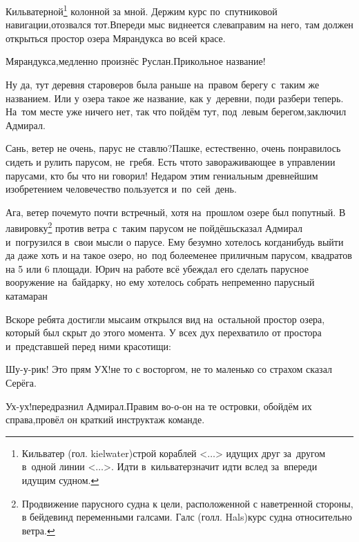 \renewcommand*{\thefootnote}{\fnsymbol{footnote}}
\setcounter{footnote}{0}
\diagdash Кильватерной\footnote{Кильватер (гол. kielwater)\mdash строй кораблей <$\dots$> идущих друг за~другом в~одной линии <$\dots$>. Идти в~кильватер\mdash значит идти вслед за~впереди идущим судном.} колонной за мной. Держим курс по~спутниковой навигации,\mdash отозвался тот.\mdash Впереди мыс виднеется слева\mdash правим на него, там должен открыться простор озера Мярандукса во всей красе.

\diagdash Мярандукса,\mdash медленно произнёс Руслан.\mdash Прикольное название!

\diagdash Ну да, тут деревня староверов была раньше на~правом берегу с~таким же названием. Или у озера такое же название, как у~деревни, поди разбери теперь. На~том месте уже ничего нет, так что пойдём тут, под~левым берегом,\mdash заключил Адмирал.

\diagdash Сань, ветер не очень, парус не ставлю?\mdash Пашке, естественно, очень понравилось сидеть и рулить парусом, не~гребя. Есть что\sdash то завораживающее в управлении парусами, кто бы что ни говорил! Недаром этим гениальным древнейшим изобретением человечество пользуется и~по~сей~день.

\renewcommand*{\thefootnote}{\fnsymbol{footnote}}
\setcounter{footnote}{0}
\diagdash Ага, ветер почему\sdash то почти встречный, хотя на~прошлом озере был попутный. В лавировку\footnote{Продвижение парусного судна к цели, расположенной с наветренной стороны, в бейдевинд переменными галсами. Галс (голл. Hals)\mdash курс судна относительно ветра.} против ветра с~таким парусом не пойдёшь\myldots{}\mdash сказал Адмирал и~погрузился в~свои мысли о парусе. Ему безумно хотелось когда\sdash нибудь выйти да даже хоть и на такое озеро, но~под более\sdash менее приличным парусом, квадратов на 5 или 6 площади. Юрич на работе всё убеждал его сделать парусное вооружение на~байдарку, но ему хотелось собрать непременно парусный катамаран\myldots{}

\vspace{0.5cm}
\myldots{}Вскоре ребята достигли мыса\mdash им открылся вид на~остальной простор озера, который был скрыт до этого момента. У всех дух перехватило от простора и~представшей перед ними красотищи:

\diagdash Шу-у-рик! Это прям УХ!\mdash не то с восторгом, не то маленько со страхом сказал Серёга.

\diagdash Ух-ух!\mdash передразнил Адмирал.\mdash Правим во-о-он на те островки, обойдём их справа,\mdash провёл он краткий инструктаж команде.

